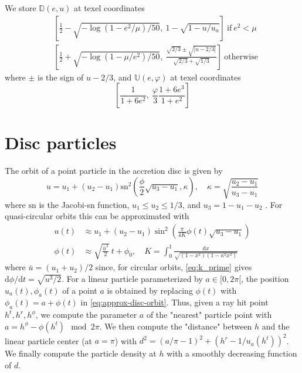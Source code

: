 \documentclass{document}
\newcommand{\diff}{\mathrm d}
\begin{document}
We store $\mathbb{D}(e,u)$ at texel coordinates
\begin{equation*}
\begin{split}
&\left[\frac{1}{2} - \sqrt{-\log(1 - e^2 / \mu) / 50},\ 1 - \sqrt{1 - u / 
u_a}\right]\ \mathrm{if}\ e^2 < \mu\\
&\left[\frac{1}{2} + \sqrt{-\log(1 - \mu / e^2) / 50},\ \frac{\sqrt{2/3} \pm 
\sqrt{|u - 2 / 3|}}{\sqrt{2 / 3} + \sqrt{1 / 3}}\right]\ \mathrm{otherwise}
\end{split}
\end{equation*}
where $\pm$ is the sign of $u-2/3$, and $\mathbb{U}(e, \varphi)$ at texel 
coordinates
\begin{equation*}
\left[\frac{1}{1 + 6 e^2},\ \frac{\varphi}{3} \frac{1 + 6 e^3}{1 + e^2}\right]
\end{equation*}

\section{Disc particles}\label{sec:discparticles}

The orbit of a point particle in the accretion disc is given by
\begin{equation*}
u = u_1 + (u_2 - u_1) \mathrm{sn}^2 
    \left(\frac{\phi}{2} \sqrt{u_3 - u_1}, \kappa\right), \quad
\kappa = \sqrt{\frac{u_2 - u_1}{u_3 - u_1}}
\end{equation*}
where $\mathrm{sn}$ is the Jacobi-sn function, $u_1 \le u_2 \le 1/3$, and 
$u_3 = 1 - u_1 - u_2$ \cite{darwin1959}. For quasi-circular orbits this can be 
approximated with
\begin{equation}
\begin{split}
u(t) &\approx 
    u_1 + (u_2 - u_1) \sin^2\left(\frac{\pi}{4K}\phi(t)\sqrt{u_3 - u_1}\right)\\
\phi(t) &\approx
    \sqrt{\frac{\bar{u}^3}{2}}\ t + \phi_0, \quad  
    K = \int_0^1 \frac{\diff x}{\sqrt{(1 - x^2)(1 - \kappa^2x^2)}}
\end{split}\label{eq:approx-disc-orbit}
\end{equation}
where $\bar{u} = (u_1 + u_2) / 2$ since, for circular orbits, 
\eqref{eq:k_prime} gives $\diff\phi / \diff t = \sqrt{u^3 / 2}$. For a linear 
particle parameterized by $a \in [0,2\pi[$, the position $u_a(t), \phi_a(t)$ of 
a point $a$ is obtained by replacing $\phi(t)$ with $\phi_a(t) = a + \phi(t)$ 
in \eqref{eq:approx-disc-orbit}. Thus, given a ray hit point $h^t, h^r, 
h^\phi$, we compute the parameter $a$ of the "nearest" particle point with $a = 
h^\phi - \phi(h^t) \mod 2\pi$. We then compute the "distance" between $h$ and 
the linear particle center (at $a = \pi$) with $d^2 = (a / \pi - 1)^2 + (h^r - 
1 / u_a(h^t))^2$. We finally compute the particle density at $h$ with a 
smoothly decreasing function of $d$.
\end{document}
